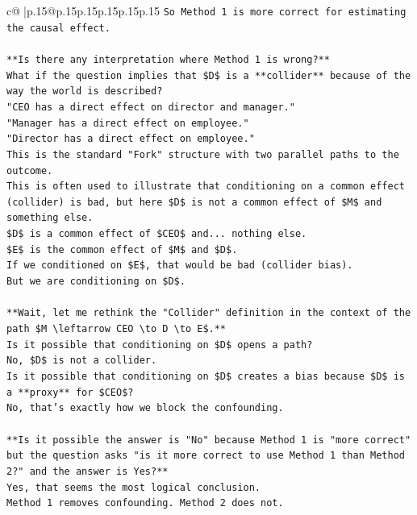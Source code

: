 \documentclass{article}
\begin{document}
{\begin{supertabular}{c@{$\;$}|p{.15\linewidth}@{}p{.15\linewidth}p{.15\linewidth}p{.15\linewidth}p{.15\linewidth}p{.15\linewidth}}
{{{\texttt{So Method 1 is more correct for estimating the causal effect.} \\
\\ 
\texttt{**Is there any interpretation where Method 1 is wrong?**} \\
\texttt{What if the question implies that \$D\$ is a **collider** because of the way the world is described?} \\
\texttt{"CEO has a direct effect on director and manager."} \\
\texttt{"Manager has a direct effect on employee."} \\
\texttt{"Director has a direct effect on employee."} \\
\texttt{This is the standard "Fork" structure with two parallel paths to the outcome.} \\
\texttt{This is often used to illustrate that conditioning on a common effect (collider) is bad, but here \$D\$ is not a common effect of \$M\$ and something else.} \\
\texttt{\$D\$ is a common effect of \$CEO\$ and... nothing else.} \\
\texttt{\$E\$ is the common effect of \$M\$ and \$D\$.} \\
\texttt{If we conditioned on \$E\$, that would be bad (collider bias).} \\
\texttt{But we are conditioning on \$D\$.} \\
\\ 
\texttt{**Wait, let me rethink the "Collider" definition in the context of the path \$M \textbackslash{}leftarrow CEO \textbackslash{}to D \textbackslash{}to E\$.**} \\
\texttt{Is it possible that conditioning on \$D\$ opens a path?} \\
\texttt{No, \$D\$ is not a collider.} \\
\texttt{Is it possible that conditioning on \$D\$ creates a bias because \$D\$ is a **proxy** for \$CEO\$?} \\
\texttt{No, that's exactly how we block the confounding.} \\
\\ 
\texttt{**Is it possible the answer is "No" because Method 1 is "more correct" but the question asks "is it more correct to use Method 1 than Method 2?" and the answer is Yes?**} \\
\texttt{Yes, that seems the most logical conclusion.} \\
\texttt{Method 1 removes confounding. Method 2 does not.} \\
}}}
\end{supertabular}}
\end{document}
